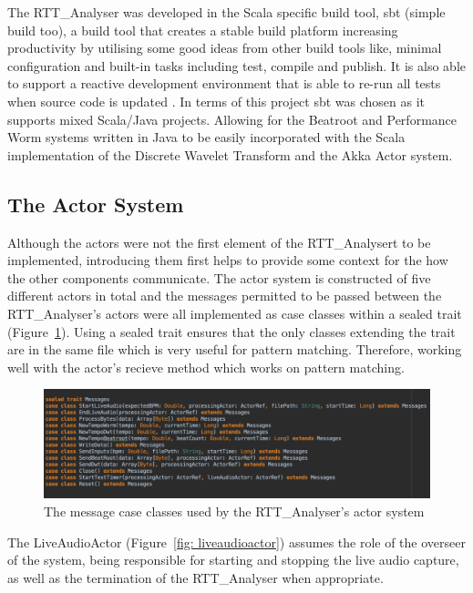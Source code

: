 \documentclass[a4paper, 11pt]{article}
\begin{document}
The RTT\_Analyser was developed in the Scala specific build tool, sbt (simple build too), a build tool that creates a stable build platform increasing productivity by utilising some good ideas from other build tools like, minimal configuration and built-in tasks including test, compile and publish. It is also able to support a reactive development environment that is able to re-run all tests when source code is updated \cite{sbt}. In terms of this project sbt was chosen as it supports mixed Scala/Java projects. Allowing for the Beatroot and Performance Worm systems written in Java to be easily incorporated with the Scala implementation of the Discrete Wavelet Transform and the Akka Actor system.

\subsection{The Actor System}
Although the actors were not the first element of the RTT\_Analysert to be implemented, introducing them first helps to provide some context for the how the other components communicate. The actor system is constructed of five different actors in total and the messages permitted to be passed between the RTT\_Analyser's actors were all implemented as case classes within a sealed trait (Figure~\ref{fig: messages}). Using a sealed trait ensures that the only classes extending the trait are in the same file which is very useful for pattern matching\cite{odesky}. Therefore, working well with the actor's recieve method which works on pattern matching.\par

\begin{figure}
\centering
\includegraphics[scale=0.25]{images/messages.jpg}
\caption{The message case classes used by the RTT\_Analyser's actor system}
\label{fig: messages}
\end{figure} 

The LiveAudioActor (Figure~\ref{fig: liveaudioactor}) assumes the role of the overseer  of the system, being responsible for starting and stopping the live audio capture, as well as the termination of the RTT\_Analyser when appropriate. \par
\end{document}
